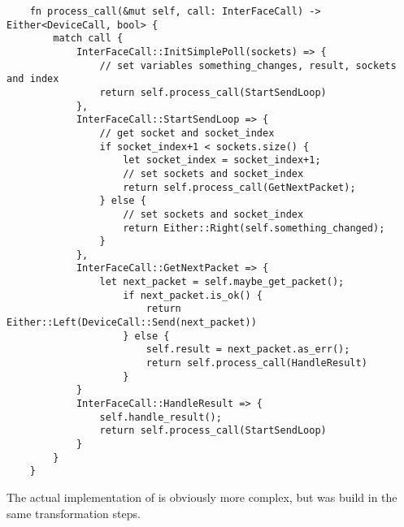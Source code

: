 \begin{verbatim}
    fn process_call(&mut self, call: InterFaceCall) -> Either<DeviceCall, bool> {
        match call {
            InterFaceCall::InitSimplePoll(sockets) => {
                // set variables something_changes, result, sockets and index
                return self.process_call(StartSendLoop)
            },
            InterFaceCall::StartSendLoop => {
                // get socket and socket_index
                if socket_index+1 < sockets.size() {
                    let socket_index = socket_index+1;
                    // set sockets and socket_index
                    return self.process_call(GetNextPacket);
                } else {
                    // set sockets and socket_index
                    return Either::Right(self.something_changed);
                }
            },
            InterFaceCall::GetNextPacket => {
                let next_packet = self.maybe_get_packet();
                    if next_packet.is_ok() {
                        return Either::Left(DeviceCall::Send(next_packet))
                    } else {
                        self.result = next_packet.as_err();
                        return self.process_call(HandleResult)
                    }
            }
            InterFaceCall::HandleResult => {
                self.handle_result();
                return self.process_call(StartSendLoop)
            }
        }
    }
\end{verbatim}

The actual implementation of  is obviously more complex, but was build in the same transformation steps. 

